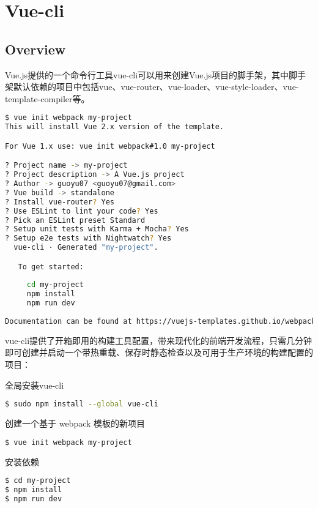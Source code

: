 \part{Vue-cli}

\chapter{Overview}

Vue.js提供的一个命令行工具vue-cli可以用来创建Vue.js项目的脚手架，其中脚手架默认依赖的项目中包括vue、vue-router、vue-loader、vue-style-loader、vue-template-compiler等。


\begin{lstlisting}[language=bash]
$ vue init webpack my-project
This will install Vue 2.x version of the template.

For Vue 1.x use: vue init webpack#1.0 my-project

? Project name -> my-project
? Project description -> A Vue.js project
? Author -> guoyu07 <guoyu07@gmail.com>
? Vue build -> standalone
? Install vue-router? Yes
? Use ESLint to lint your code? Yes
? Pick an ESLint preset Standard
? Setup unit tests with Karma + Mocha? Yes
? Setup e2e tests with Nightwatch? Yes
  vue-cli · Generated "my-project".

   To get started:
   
     cd my-project
     npm install
     npm run dev
   
Documentation can be found at https://vuejs-templates.github.io/webpack
\end{lstlisting}










vue-cli提供了开箱即用的构建工具配置，带来现代化的前端开发流程，只需几分钟即可创建并启动一个带热重载、保存时静态检查以及可用于生产环境的构建配置的项目：


\begin{compactitem}
\item 全局安装vue-cli

\begin{lstlisting}[language=bash]
$ sudo npm install --global vue-cli
\end{lstlisting}

\item 创建一个基于 webpack 模板的新项目

\begin{lstlisting}[language=bash]
$ vue init webpack my-project
\end{lstlisting}

\item 安装依赖

\begin{lstlisting}[language=bash]
$ cd my-project
$ npm install
$ npm run dev
\end{lstlisting}
\end{compactitem}

